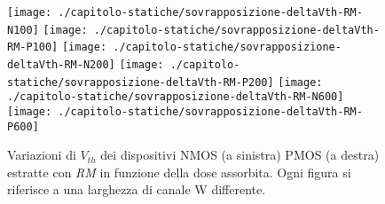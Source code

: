 

\begin{figure}[H]
  \centering
  \texttt{[image: ./capitolo-statiche/sovrapposizione-deltaVth-RM-N100]}
  \texttt{[image: ./capitolo-statiche/sovrapposizione-deltaVth-RM-P100]}
  \texttt{[image: ./capitolo-statiche/sovrapposizione-deltaVth-RM-N200]}
  \texttt{[image: ./capitolo-statiche/sovrapposizione-deltaVth-RM-P200]}
  \texttt{[image: ./capitolo-statiche/sovrapposizione-deltaVth-RM-N600]}
  \texttt{[image: ./capitolo-statiche/sovrapposizione-deltaVth-RM-P600]}
  \caption{Variazioni di $V_{th}$ dei dispositivi NMOS (a sinistra) PMOS (a destra) estratte con \emph{RM} in funzione della dose assorbita. Ogni figura si riferisce a una larghezza di canale W differente.}

\end{figure}